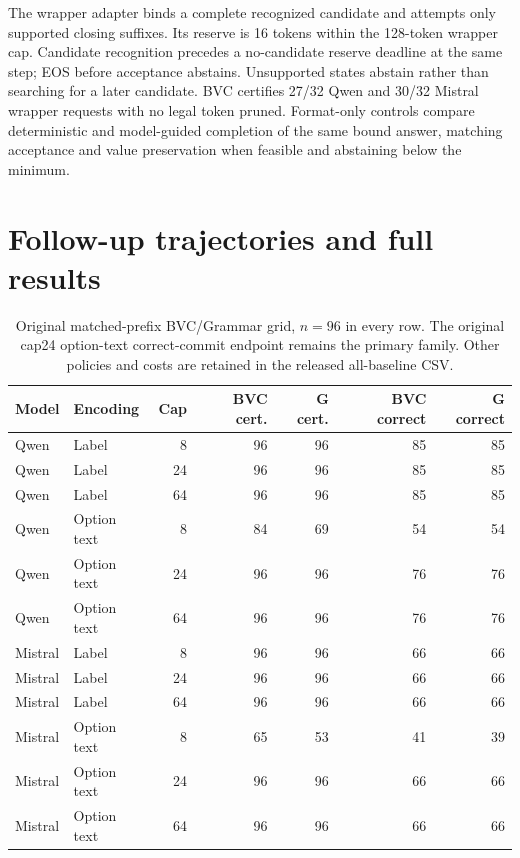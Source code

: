 \documentclass[12pt,a4paper]{article}
\begin{document}
The wrapper adapter binds a complete recognized candidate and attempts only supported closing suffixes. Its reserve is 16 tokens within the 128-token wrapper cap. Candidate recognition precedes a no-candidate reserve deadline at the same step; EOS before acceptance abstains. Unsupported states abstain rather than searching for a later candidate. BVC certifies 27/32 Qwen and 30/32 Mistral wrapper requests with no legal token pruned. Format-only controls compare deterministic and model-guided completion of the same bound answer, matching acceptance and value preservation when feasible and abstaining below the minimum.

\section{Follow-up trajectories and full results}
\begin{longtable}{@{}llrrrrr@{}}
\caption{Original matched-prefix BVC/Grammar grid, $n=96$ in every row. The original cap24 option-text correct-commit endpoint remains the primary family. Other policies and costs are retained in the released all-baseline CSV.}\label{tab:originalgrid}\\
\toprule
Model & Encoding & Cap & BVC cert. & G cert. & BVC correct & G correct \\
\midrule
\endhead
Qwen & Label & 8 & 96 & 96 & 85 & 85 \\
Qwen & Label & 24 & 96 & 96 & 85 & 85 \\
Qwen & Label & 64 & 96 & 96 & 85 & 85 \\
Qwen & Option text & 8 & 84 & 69 & 54 & 54 \\
Qwen & Option text & 24 & 96 & 96 & 76 & 76 \\
Qwen & Option text & 64 & 96 & 96 & 76 & 76 \\
Mistral & Label & 8 & 96 & 96 & 66 & 66 \\
Mistral & Label & 24 & 96 & 96 & 66 & 66 \\
Mistral & Label & 64 & 96 & 96 & 66 & 66 \\
Mistral & Option text & 8 & 65 & 53 & 41 & 39 \\
Mistral & Option text & 24 & 96 & 96 & 66 & 66 \\
Mistral & Option text & 64 & 96 & 96 & 66 & 66 \\
\bottomrule
\end{longtable}
\end{document}
